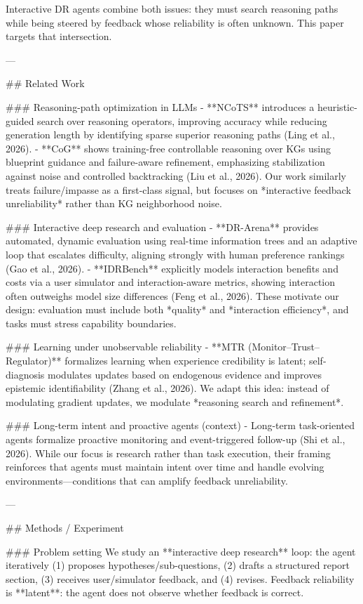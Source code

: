 Interactive DR agents combine both issues: they must search reasoning paths while being steered by feedback whose reliability is often unknown. This paper targets that intersection.

---

## Related Work  

### Reasoning-path optimization in LLMs  
- **NCoTS** introduces a heuristic-guided search over reasoning operators, improving accuracy while reducing generation length by identifying sparse superior reasoning paths (Ling et al., 2026).  
- **CoG** shows training-free controllable reasoning over KGs using blueprint guidance and failure-aware refinement, emphasizing stabilization against noise and controlled backtracking (Liu et al., 2026). Our work similarly treats failure/impasse as a first-class signal, but focuses on *interactive feedback unreliability* rather than KG neighborhood noise.

### Interactive deep research and evaluation  
- **DR-Arena** provides automated, dynamic evaluation using real-time information trees and an adaptive loop that escalates difficulty, aligning strongly with human preference rankings (Gao et al., 2026).  
- **IDRBench** explicitly models interaction benefits and costs via a user simulator and interaction-aware metrics, showing interaction often outweighs model size differences (Feng et al., 2026).  
These motivate our design: evaluation must include both *quality* and *interaction efficiency*, and tasks must stress capability boundaries.

### Learning under unobservable reliability  
- **MTR (Monitor–Trust–Regulator)** formalizes learning when experience credibility is latent; self-diagnosis modulates updates based on endogenous evidence and improves epistemic identifiability (Zhang et al., 2026). We adapt this idea: instead of modulating gradient updates, we modulate *reasoning search and refinement*.

### Long-term intent and proactive agents (context)  
- Long-term task-oriented agents formalize proactive monitoring and event-triggered follow-up (Shi et al., 2026). While our focus is research rather than task execution, their framing reinforces that agents must maintain intent over time and handle evolving environments—conditions that can amplify feedback unreliability.

---

## Methods / Experiment  

### Problem setting  
We study an **interactive deep research** loop: the agent iteratively (1) proposes hypotheses/sub-questions, (2) drafts a structured report section, (3) receives user/simulator feedback, and (4) revises. Feedback reliability is **latent**: the agent does not observe whether feedback is correct.

